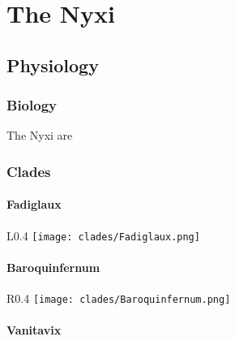 
\part{The Nyxi}



\chapter{Physiology}

\section{Biology}

The Nyxi are

\section{Clades}

\subsection{Fadiglaux}

\begin{wrapfigure}{L}{0.4\textwidth}
	\centering
	\texttt{[image: clades/Fadiglaux.png]}
\end{wrapfigure}

\lipsum[1]

\subsection{Baroquinfernum}

\begin{wrapfigure}{R}{0.4\textwidth}
	\centering
	\texttt{[image: clades/Baroquinfernum.png]}
\end{wrapfigure}

\lipsum[2]

\subsection{Vanitavix}


